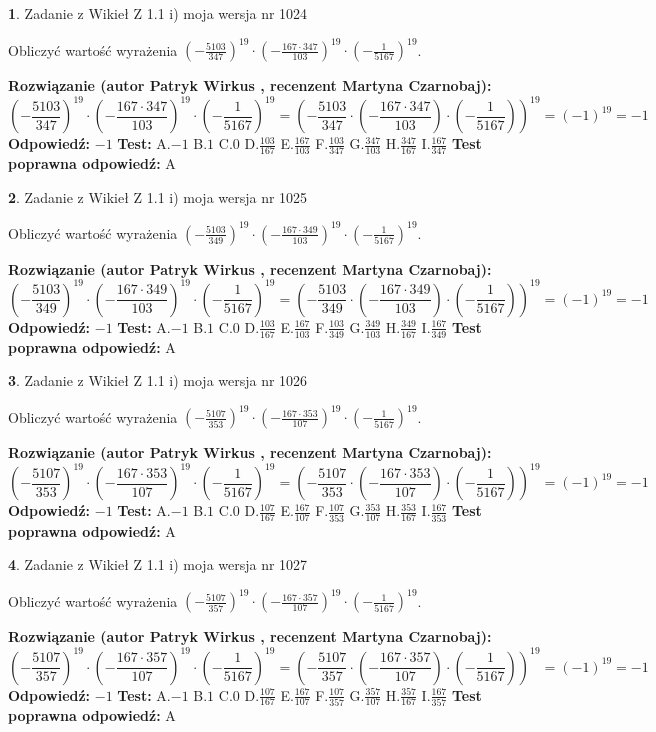 \documentclass[12pt, a4paper]{article}
\theoremstyle{definition} %
\newtheorem{zad}{}
\newcommand{\zadStart}[1]{\begin{zad}#1\newline}
\newcommand{\zadStop}{\end{zad}}
\newcommand{\rozwStart}[2]{\noindent \textbf{Rozwiązanie (autor #1 , recenzent #2): }\newline}
\newcommand{\rozwStop}{\newline}
\newcommand{\odpStart}{\noindent \textbf{Odpowiedź:}\newline}
\newcommand{\odpStop}{\newline}
\newcommand{\testStart}{\noindent \textbf{Test:}\newline}
\newcommand{\testStop}{\newline}
\newcommand{\kluczStart}{\noindent \textbf{Test poprawna odpowiedź:}\newline}
\newcommand{\kluczStop}{\newline}
\begin{document}
\zadStart{Zadanie z Wikieł Z 1.1 i) moja wersja nr 1024}

Obliczyć wartość wyrażenia $(-\frac{5103}{347})^{19} \cdot (-\frac{167 \cdot 347}{103})^{19} \cdot (-\frac{1}{5167})^{19}$.
\zadStop
\rozwStart{Patryk Wirkus}{Martyna Czarnobaj}
$$(-\frac{5103}{347})^{19} \cdot (-\frac{167 \cdot 347}{103})^{19} \cdot (-\frac{1}{5167})^{19} = (-\frac{5103}{347} \cdot (-\frac{167 \cdot 347}{103}) \cdot (-\frac{1}{5167}))^{19} = (-1)^{19} = -1$$
\rozwStop
\odpStart
$-1$
\odpStop
\testStart
A.$-1$ B.$1$ C.$0$ D.$\frac{103}{167}$ E.$\frac{167}{103}$
F.$\frac{103}{347}$ G.$\frac{347}{103}$
H.$\frac{347}{167}$
I.$\frac{167}{347}$
\testStop
\kluczStart
A
\kluczStop



\zadStart{Zadanie z Wikieł Z 1.1 i) moja wersja nr 1025}

Obliczyć wartość wyrażenia $(-\frac{5103}{349})^{19} \cdot (-\frac{167 \cdot 349}{103})^{19} \cdot (-\frac{1}{5167})^{19}$.
\zadStop
\rozwStart{Patryk Wirkus}{Martyna Czarnobaj}
$$(-\frac{5103}{349})^{19} \cdot (-\frac{167 \cdot 349}{103})^{19} \cdot (-\frac{1}{5167})^{19} = (-\frac{5103}{349} \cdot (-\frac{167 \cdot 349}{103}) \cdot (-\frac{1}{5167}))^{19} = (-1)^{19} = -1$$
\rozwStop
\odpStart
$-1$
\odpStop
\testStart
A.$-1$ B.$1$ C.$0$ D.$\frac{103}{167}$ E.$\frac{167}{103}$
F.$\frac{103}{349}$ G.$\frac{349}{103}$
H.$\frac{349}{167}$
I.$\frac{167}{349}$
\testStop
\kluczStart
A
\kluczStop



\zadStart{Zadanie z Wikieł Z 1.1 i) moja wersja nr 1026}

Obliczyć wartość wyrażenia $(-\frac{5107}{353})^{19} \cdot (-\frac{167 \cdot 353}{107})^{19} \cdot (-\frac{1}{5167})^{19}$.
\zadStop
\rozwStart{Patryk Wirkus}{Martyna Czarnobaj}
$$(-\frac{5107}{353})^{19} \cdot (-\frac{167 \cdot 353}{107})^{19} \cdot (-\frac{1}{5167})^{19} = (-\frac{5107}{353} \cdot (-\frac{167 \cdot 353}{107}) \cdot (-\frac{1}{5167}))^{19} = (-1)^{19} = -1$$
\rozwStop
\odpStart
$-1$
\odpStop
\testStart
A.$-1$ B.$1$ C.$0$ D.$\frac{107}{167}$ E.$\frac{167}{107}$
F.$\frac{107}{353}$ G.$\frac{353}{107}$
H.$\frac{353}{167}$
I.$\frac{167}{353}$
\testStop
\kluczStart
A
\kluczStop



\zadStart{Zadanie z Wikieł Z 1.1 i) moja wersja nr 1027}

Obliczyć wartość wyrażenia $(-\frac{5107}{357})^{19} \cdot (-\frac{167 \cdot 357}{107})^{19} \cdot (-\frac{1}{5167})^{19}$.
\zadStop
\rozwStart{Patryk Wirkus}{Martyna Czarnobaj}
$$(-\frac{5107}{357})^{19} \cdot (-\frac{167 \cdot 357}{107})^{19} \cdot (-\frac{1}{5167})^{19} = (-\frac{5107}{357} \cdot (-\frac{167 \cdot 357}{107}) \cdot (-\frac{1}{5167}))^{19} = (-1)^{19} = -1$$
\rozwStop
\odpStart
$-1$
\odpStop
\testStart
A.$-1$ B.$1$ C.$0$ D.$\frac{107}{167}$ E.$\frac{167}{107}$
F.$\frac{107}{357}$ G.$\frac{357}{107}$
H.$\frac{357}{167}$
I.$\frac{167}{357}$
\testStop
\kluczStart
A
\kluczStop
\end{document}
